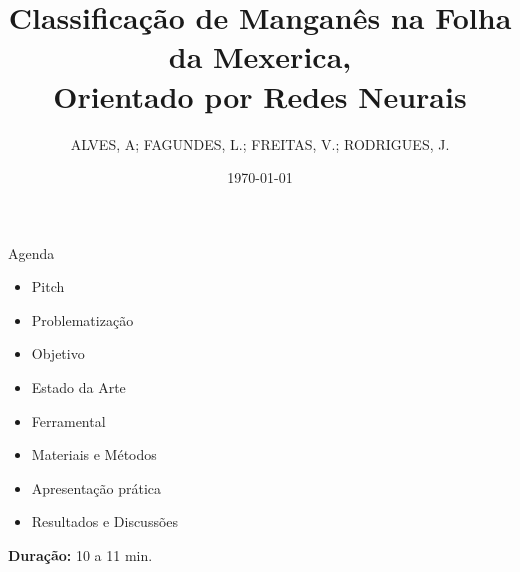 \documentclass[aspectratio=169]{beamer}
\title{Classificação de Manganês na Folha da Mexerica, \\ Orientado por Redes Neurais}
\subtitle{}
\author[DSM]{ALVES, A; FAGUNDES, L.; FREITAS, V.; RODRIGUES, J.}
\institute{Desenvolvimento de Software Multiplataforma\\FATEC Registro}
\date{\today}
\begin{document}
\begin{frame}
  \vspace{0.8cm}
  \begin{center}
    
    \vspace{0.4cm}
    
    {\normalsize\bfseries\inserttitle}\par
    
    \vspace{0.45cm}
    
    {\tiny\insertauthor}\par
    
    \vspace{0.1cm}
    
    {\small\textcolor{azulComplementar}{\insertsubtitle}}\par
    
    \vspace{0.5cm}
    
    
    \vspace{0.3cm}
    
    {\scriptsize\insertinstitute}\par
    
    \vspace{0.01cm}
    
    {\tiny\textcolor{azulComplementar}{\insertdate}}\par
  \end{center}
\end{frame}

\begin{frame}[b]{Agenda}
  \begin{itemize}
    \item Pitch
    \item Problematização
    \item Objetivo
    \item Estado da Arte
    \item Ferramental
    \item Materiais e Métodos
    \item Apresentação prática
    \item Resultados e Discussões
  \end{itemize}
  
  \vfill
  
  \hfill{\scriptsize \textbf{Duração:} 10 a 11 min.}
\end{frame}
\end{document}
